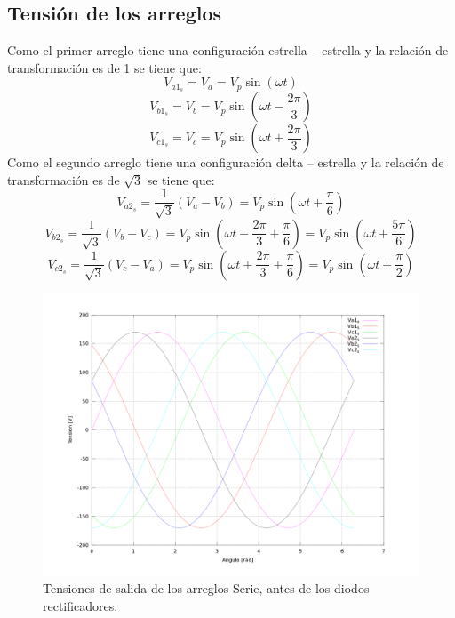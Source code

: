 \documentclass[12pt,graphicx,caption,rotating]{article}
\begin{document}
\subsection{Tensión de los arreglos}
\noindent
Como el primer arreglo tiene una configuración estrella – estrella y la relación de transformación es de 1 se tiene que:
\begin{equation}
 V_{a1_{s}} = V_a = V_p \sin \left (\omega t \right)
 \label{ecu4}
\end{equation}
\begin{equation}
 V_{b1_{s}} = V_b = V_p \sin \left (\omega t - \frac{2 \pi}{3}\right)
 \label{ecu5}
\end{equation}
\begin{equation}
 V_{c1_{s}} = V_c = V_p \sin \left (\omega t+ \frac{2 \pi}{3}\right )
 \label{ecu6}
\end{equation}
\noindent
Como el segundo arreglo tiene una configuración delta – estrella y la relación de transformación es de $\sqrt{3}$ se tiene que:
\begin{equation}
 {V_{a{2_s}}} = \frac{1}{{\sqrt 3 }}\left( {{V_a} - {V_b}} \right) = {V_p}\sin \left( {\omega t + \frac{\pi }{6}} \right)
 \label{ecu7}
\end{equation}
\begin{equation}
 {V_{b{2_s}}} = \frac{1}{{\sqrt 3 }}\left( {{V_b} - {V_c}} \right) = {V_p}\sin \left( {\omega t - \frac{{2\pi }}{3} + \frac{\pi }{6}} \right) = {V_p}\sin \left( {\omega t + \frac{{5\pi }}{6}} \right)
 \label{ecu8}
\end{equation}
\begin{equation}
 {V_{c{2_s}}} = \frac{1}{{\sqrt 3 }}\left( {{V_c} - {V_a}} \right) = {V_p}\sin \left( {\omega t + \frac{{2\pi }}{3} + \frac{\pi }{6}} \right) = {V_p}\sin \left( {\omega t + \frac{\pi }{2}} \right)
 \label{ecu9}
\end{equation}
\begin{figure}[H]
	\centering
		\includegraphics[scale=0.4]{tensiones_in.png}
	\caption{Tensiones de salida de los arreglos Serie, antes de los diodos rectificadores.}
	\label{fig1}
\end{figure}
\end{document}
